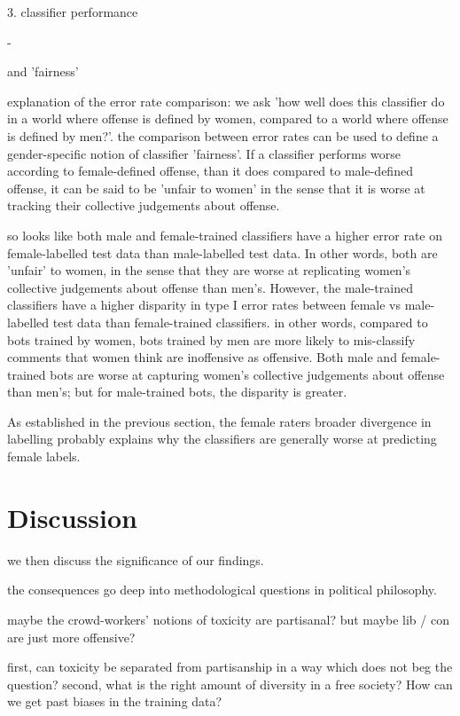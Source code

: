 \documentclass[runningheads,a4paper]{llncs}
\begin{document}
3. classifier performance


-

and 'fairness'

explanation of the error rate comparison: we ask 'how well does this classifier do in a world where offense is defined by women, compared to a world where offense is defined by men?'. the comparison between error rates can be used to define a gender-specific notion of classifier 'fairness'. If a classifier performs worse according to female-defined offense, than it does compared to male-defined offense, it can be said to be 'unfair to women' in the sense that it is worse at tracking their collective judgements about offense.



so looks like both male and female-trained classifiers have a higher error rate on female-labelled test data than male-labelled test data. In other words, both are 'unfair' to women, in the sense that they are worse at replicating women's collective judgements about offense than men's. However, the male-trained classifiers have a higher disparity in type I error rates between female vs male-labelled test data than female-trained classifiers. in other words, compared to bots trained by women, bots trained by men are more likely to mis-classify comments that women think are inoffensive as offensive. Both male and female-trained bots are worse at capturing women's collective judgements about offense than men's; but for male-trained bots, the disparity is greater.

As established in the previous section, the female raters broader divergence in labelling probably explains why the classifiers are generally worse at predicting female labels.

\section{Discussion}

we then discuss the significance of our findings.

the consequences go deep into methodological questions in political philosophy.

maybe the crowd-workers’ notions of toxicity are partisanal?
but maybe lib / con are just more offensive?

first, can toxicity be separated from partisanship in a way which does not beg the question?
second, what is the right amount of diversity in a free society?
How can we get past biases in the training data?
\end{document}
